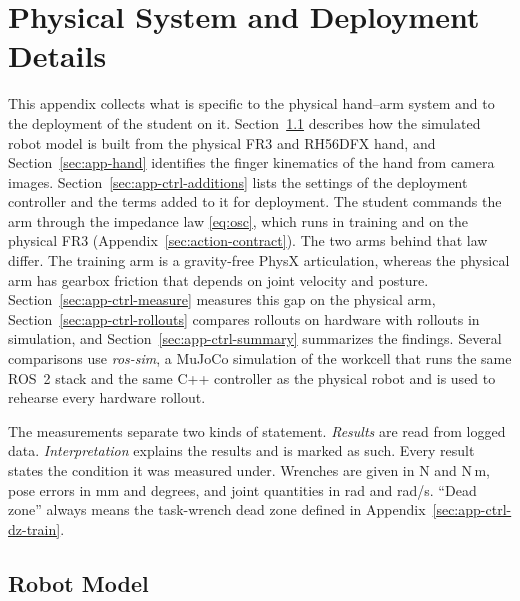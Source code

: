 \chapter{Physical System and Deployment Details}\label{ch:app-controller}%
\sloppy%

This appendix collects what is specific to the physical hand--arm system and to the deployment of the student on it. Section~\ref{sec:app-assets} describes how the simulated robot model is built from the physical \ac{FR3} and RH56DFX hand, and Section~\ref{sec:app-hand} identifies the finger kinematics of the hand from camera images. Section~\ref{sec:app-ctrl-additions} lists the settings of the deployment controller and the terms added to it for deployment. The student commands the arm through the impedance law \eqref{eq:osc}, which runs in training and on the physical \ac{FR3} (Appendix~\ref{sec:action-contract}). The two arms behind that law differ. The training arm is a gravity-free PhysX articulation, whereas the physical arm has gearbox friction that depends on joint velocity and posture. Section~\ref{sec:app-ctrl-measure} measures this gap on the physical arm, Section~\ref{sec:app-ctrl-rollouts} compares rollouts on hardware with rollouts in simulation, and Section~\ref{sec:app-ctrl-summary} summarizes the findings. Several comparisons use \emph{ros-sim}, a MuJoCo simulation of the workcell that runs the same ROS~2 stack and the same C++ controller as the physical robot and is used to rehearse every hardware rollout.

The measurements separate two kinds of statement. \emph{Results} are read from logged data. \emph{Interpretation} explains the results and is marked as such. Every result states the condition it was measured under. Wrenches are given in N and N\,m, pose errors in mm and degrees, and joint quantities in rad and rad/s. ``Dead zone'' always means the task-wrench dead zone defined in Appendix~\ref{sec:app-ctrl-dz-train}.

\section{Robot Model}\label{sec:app-assets}

